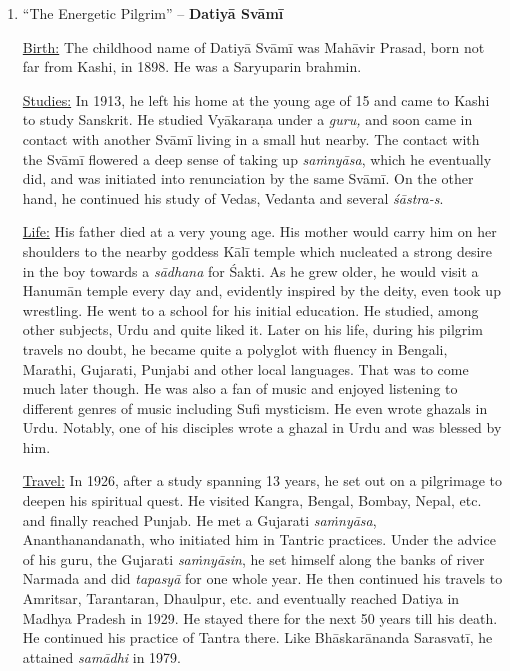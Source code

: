 \begin{enumerate}
 \item  “The Energetic Pilgrim” – \textbf{Datiyā Svāmī}

 \underline{Birth:} The childhood name of Datiyā Svāmī was Mahāvir Prasad, born not far from Kashi, in 1898. He was a Saryuparin brahmin.

 \underline{Studies:} In 1913, he left his home at the young age of 15 and came to Kashi to study Sanskrit. He studied Vyākaraṇa under a \textit{guru,} and soon came in contact with another Svāmī living in a small hut nearby. The contact with the Svāmī flowered a deep sense of taking up \textit{saṁnyāsa}, which he eventually did, and was initiated into renunciation by the same Svāmī. On the other hand, he continued his study of {Vedas, Vedanta} and several \textit{śāstra-s}.


 \underline{Life:} His father died at a very young age. His mother would carry him on her shoulders to the nearby goddess Kālī temple which nucleated a strong desire in the boy towards a \textit{sādhana} for Śakti. As he grew older, he would visit a Hanumān temple every day and, evidently inspired by the deity, even took up wrestling. He went to a school for his initial education. He studied, among other subjects, Urdu and quite liked it. Later on his life, during his pilgrim travels no doubt, he became quite a polyglot with fluency in Bengali, Marathi, Gujarati, Punjabi and other local languages. That was to come much later though. He was also a fan of music and enjoyed listening to different genres of music including Sufi mysticism. He even wrote ghazals in Urdu. Notably, one of his disciples wrote a ghazal in Urdu and was blessed by him.

 \underline{Travel:} In 1926, after a study spanning 13 years, he set out on a pilgrimage to deepen his spiritual quest. He visited Kangra, Bengal, Bombay, Nepal, etc. and finally reached Punjab. He met a Gujarati \textit{saṁnyāsa}, Ananthanandanath, who initiated him in Tantric practices. Under the advice of his guru, the Gujarati \textit{saṁnyāsin}, he set himself along the banks of river Narmada and did \textit{tapasyā} for one whole year. He then continued his travels to Amritsar, Tarantaran, Dhaulpur, etc. and eventually reached Datiya in Madhya Pradesh in 1929. He stayed there for the next 50 years till his death. He continued his practice of Tantra there. Like Bhāskarānanda Sarasvatī, he attained \textit{samādhi} in 1979.


\end{enumerate}
